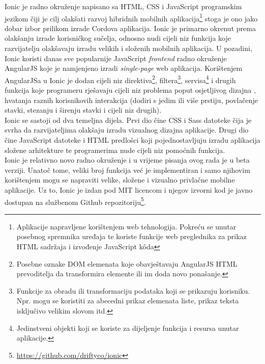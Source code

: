 Ionic je radno okruženje napisano sa HTML, CSS i JavaScript programskim jezikom čiji je cilj olakšati razvoj hibridnih mobilnih aplikacija\footnote{Aplikacije napravljene korištenjem web tehnologija. Pokreću se unutar posebnog spremnika uređaja te koriste funkcije web preglednika za prikaz HTML sadržaja i izvođenje JavaScript k\^oda} stoga je ono jako dobar izbor prilikom izrade Cordova aplikacija. 
Ionic je primarno okrenut prema olakšanju izrade korisničkog sučelja, odnosno nudi cijeli niz funkcija koje razvijatelju olakšavaju izradu velikih i složenih mobilnih aplikacija. 
U pozadini, Ionic koristi danas sve popularnije JavaScript \textit{frontend} radno okruženje AngularJS koje je namjenjeno izradi \textit{single-page} web aplikacija. 
Korištenjem AngularJSa u Ionic je dodan cijeli niz direktiva\footnote{Posebne oznake DOM elemenata koje obavještavaju AngularJS HTML prevoditelja da transformira elemente ili im doda novo ponašanje.}, filtera\footnote{Funkcije za obradu ili transformaciju podataka koji se prikazuju korisniku. Npr. mogu se koristiti za abecedni prikaz elemenata liste, prikaz teksta isključivo velikim slovom itd.}, servisa\footnote{Jedinstveni objekti  koji se koriste za dijeljenje funkcija i resursa unutar aplikacije.} i drugih funkcija koje programeru rješavaju cijeli niz problema poput osjetljivog dizajna , hvatanja raznih korisnikovih interakcija (dodiri s jedim ili više prstiju, povlačenje  stavki, stezanju i širenju stavki  i cijeli niz drugih). 
\\

Ionic se sastoji od dva temeljna dijela. Prvi dio čine CSS i Sass datoteke čija je svrha da razvijateljima olakšaju izradu vizualnog dizajna aplikacije. 
Drugi dio čine JavaScript datoteke i HTML predlošci koji pojednostavljuju izradu aplikacija složene arhitekture te programerima nude cijeli niz pomoćnih funkcija.
\\

Ionic je relativno novo radno okruženje i u vrijeme pisanja ovog rada je u beta verziji. Unatoč tome, veliki broj funkcija već je implementiran i samo njihovim korištenjem mogu se napraviti velike, složene i vizualno privlačne mobilne aplikacije. 
Uz to, Ionic je izdan pod MIT licencom i njegov izvorni kod je javno dostupan na službenom Github repozitoriju\footnote{\url{https://github.com/driftyco/ionic}}.